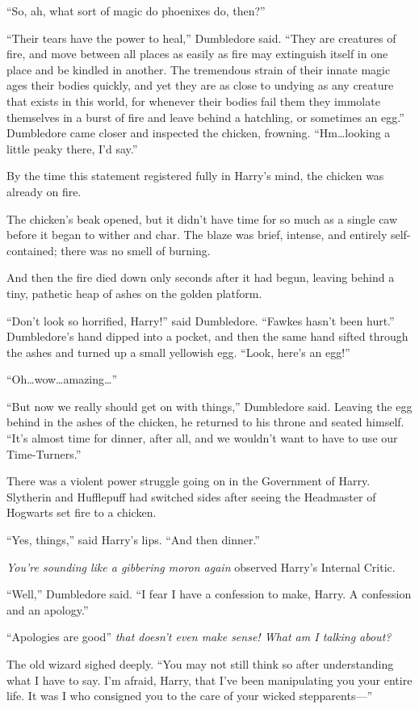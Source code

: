 “So, ah, what sort of magic do phoenixes do, then?”

“Their tears have the power to heal,” Dumbledore said. “They are creatures of fire, and move between all places as easily as fire may extinguish itself in one place and be kindled in another. The tremendous strain of their innate magic ages their bodies quickly, and yet they are as close to undying as any creature that exists in this world, for whenever their bodies fail them they immolate themselves in a burst of fire and leave behind a hatchling, or sometimes an egg.” Dumbledore came closer and inspected the chicken, frowning. “Hm…looking a little peaky there, I’d say.”

By the time this statement registered fully in Harry’s mind, the chicken was already on fire.

The chicken’s beak opened, but it didn’t have time for so much as a single caw before it began to wither and char. The blaze was brief, intense, and entirely self-contained; there was no smell of burning.

And then the fire died down only seconds after it had begun, leaving behind a tiny, pathetic heap of ashes on the golden platform.

“Don’t look so horrified, Harry!” said Dumbledore. “Fawkes hasn’t been hurt.” Dumbledore’s hand dipped into a pocket, and then the same hand sifted through the ashes and turned up a small yellowish egg. “Look, here’s an egg!”

“Oh…wow…amazing…”

“But now we really should get on with things,” Dumbledore said. Leaving the egg behind in the ashes of the chicken, he returned to his throne and seated himself. “It’s almost time for dinner, after all, and we wouldn’t want to have to use our Time-Turners.”

There was a violent power struggle going on in the Government of Harry. Slytherin and Hufflepuff had switched sides after seeing the Headmaster of Hogwarts set fire to a chicken.

“Yes, things,” said Harry’s lips. “And then dinner.”

\emph{You’re sounding like a gibbering moron again} observed Harry’s Internal Critic.

“Well,” Dumbledore said. “I fear I have a confession to make, Harry. A confession and an apology.”

“Apologies are good” \emph{that doesn’t even make sense! What am I talking about?}

The old wizard sighed deeply. “You may not still think so after understanding what I have to say. I’m afraid, Harry, that I’ve been manipulating you your entire life. It was I who consigned you to the care of your wicked stepparents—”

